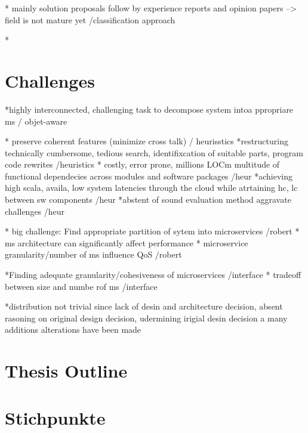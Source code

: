 * mainly solution proposals follow by experience reports and opinion papers --> field is not mature yet /classification approach

*

\section{Challenges}
\label{sec:Introduction:Challenges}

*highly interconnected, challenging task to decompose system intoa ppropriare ms / objet-aware

* preserve coherent features (minimize cross talk) / heurisstics
*restructuring technically cumbersome, tedious search, identifixcation of suitable parts, program code rewrites /heuristics
* costly, error prone, millions LOCm multitude of functional dependecies across modules and software packages /heur
*achieving high scala, availa, low system latencies through the cloud while atrtaining hc, lc between sw  components /heur
*abstent of sound evaluation method aggravate challenges /heur

* big challenge: Find appropriate partition of sytem into microservices /robert
* ms architecture can significantly affect performance
* microservice granularity/number of ms influence QoS /robert

*Finding adequate granularity/cohesiveness of microservices /interface
* tradeoff between size and numbe rof ms /interface


*distribution not trivial since lack of desin and architecture decision, absent rasoning on original design decision, udermining irigial desin decision a many additions alterations have been made

\section{Thesis Outline}
\label{sec_Introduction:ThesisOutline}













\section{Stichpunkte}

